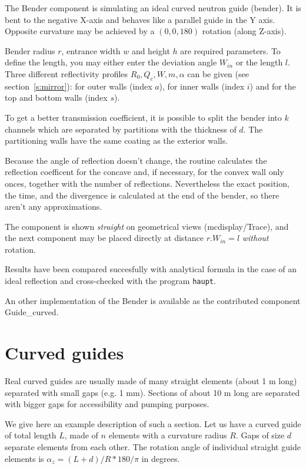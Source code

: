 The Bender component is simulating an ideal curved neutron guide (bender). It is bent to the negative X-axis and behaves like a parallel guide in the Y axis. Opposite curvature may be achieved by a $(0,0,180)$ rotation (along Z-axis).

Bender radius $r$, entrance width $w$ and height $h$ are required parameters. To define the length, you may either enter the deviation angle $W_{in}$ or the length $l$. Three different reflectivity profiles $R_0,Q_c,W,m,\alpha$ can be given (see section~\ref{s:mirror}): for outer
walls (index $a$), for inner walls (index $i$) and for the top and bottom walls (index $s$).

To get a better transmission coefficient, it is possible to split the bender into $k$ channels which are separated by partitions with the thickness of $d$. The partitioning walls have the same coating as the exterior walls.

Because the angle of reflection doesn't change, the routine
calculates the reflection coefficent for the concave and, if necessary, for the convex wall only onces, together with the number of reflections.
Nevertheless the exact position, the time, and the divergence is calculated at the end of the bender, so there aren't any approximations.

The component is shown \emph{straight} on geometrical views (mcdisplay/Trace), and the next component may be placed directly at distance $r.W_{in} = l$ \emph{without} rotation.

Results have been compared succesfully with analytical formula in the case of an ideal reflection and cross-checked with the program \verb+haupt+.

An other implementation of the Bender is available as the contributed component Guide\_curved.

\section{Curved guides}

Real curved guides are usually made of many straight elements (about 1 m long) separated with small gaps (e.g. 1 mm). Sections of about 10 m long are separated with bigger gaps for accessibility and pumping purposes.

We give here an example description of such a section. Let us have a curved guide of total length $L$, made of $n$ elements with a curvature radius $R$. Gaps of size $d$ separate elements from each other. The rotation angle of individual straight guide elements is $\alpha_z = (L+d)/R*180/\pi$ in degrees.

